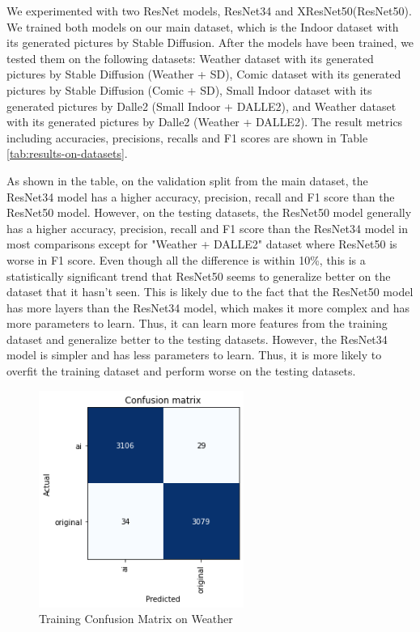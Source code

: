\documentclass[11pt]{article}
\begin{document}
We experimented with two ResNet models, ResNet34 and XResNet50(ResNet50). We trained both models on our main dataset, which is the Indoor dataset with its generated pictures by Stable Diffusion.  After the models have been trained, we tested them on the following datasets: Weather dataset with its generated pictures by Stable Diffusion (Weather + SD), Comic dataset with its generated pictures by Stable Diffusion (Comic + SD), Small Indoor dataset with its generated pictures by Dalle2 (Small Indoor + DALLE2), and Weather dataset with its generated pictures by Dalle2 (Weather + DALLE2). The result metrics including accuracies, precisions, recalls and F1 scores are shown in Table \ref{tab:results-on-datasets}.

As shown in the table, on the validation split from the main dataset, the ResNet34 model has a higher accuracy, precision, recall and F1 score than the ResNet50 model. However, on the testing datasets, the ResNet50 model generally has a higher accuracy, precision, recall and F1 score than the ResNet34 model in most comparisons except for "Weather + DALLE2" dataset where ResNet50 is worse in F1 score. Even though all the difference is within 10\%, this is a statistically significant trend that ResNet50 seems to generalize better on the dataset that it hasn't seen. This is likely due to the fact that the ResNet50 model has more layers than the ResNet34 model, which makes it more complex and has more parameters to learn. Thus, it can learn more features from the training dataset and generalize better to the testing datasets. However, the ResNet34 model is simpler and has less parameters to learn. Thus, it is more likely to overfit the training dataset and perform worse on the testing datasets.

\begin{figure}[ht]
  \includegraphics[width=190pt]{./assets/paper_training_confusion_matrix.png}
  \caption{Training Confusion Matrix on Weather}
  \label{fig:paper_training_confusion_matrix}
\end{figure}
\end{document}
